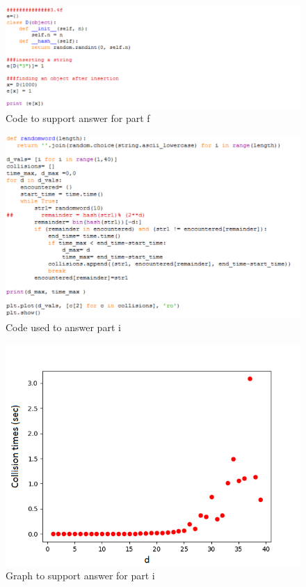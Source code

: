 \documentclass[12pt,twoside]{article}
\begin{document}
\begin{problems}
\begin{figure}
	\centering 
	\includegraphics[width=\linewidth]{fig4.png}
	\caption{Code to support answer for part f}
	\label{fig:stuf}
\end{figure}

\clearpage

\begin{figure}[h]
	\centering 
	\includegraphics[width=\linewidth]{icode.png}
	\caption{Code used to answer part i}
	\label{fig:stuf}
\end{figure}

\begin{figure}
	\centering 
	\includegraphics[width=\linewidth]{i.png}
	\caption{Graph to support answer for part i}
	\label{fig:stuf}
\end{figure}

\end{problems}
\end{document}
